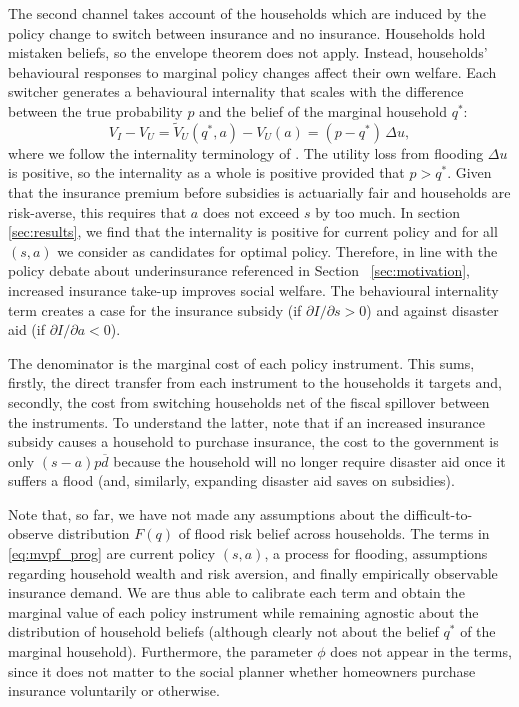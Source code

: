 \documentclass[12pt]{article}
\begin{document}
The second channel takes account of the households which are induced by the policy change to switch between insurance and no insurance. Households hold mistaken beliefs, so the envelope theorem does not apply. Instead, households' behavioural responses to marginal policy changes affect their own welfare. Each switcher generates a behavioural internality that scales with the difference between the true probability $p$ and the belief of the marginal household $q^*$:
\begin{equation}
    V_I - V_U = \tilde{V}_U(q^*,a) - V_U(a) = (p-q^*)\,\Delta u, \label{eq:internality_prog}
\end{equation}
where we follow the internality terminology of \cite{allcott2019regressive}. The utility loss from flooding $\Delta u$ is positive, so the internality as a whole is positive provided that $p>q^*$. Given that the insurance premium before subsidies is actuarially fair and households are risk-averse, this requires that $a$ does not exceed $s$ by too much. In section \ref{sec:results}, we find that the internality is positive for current policy and for all $(s,a)$ we consider as candidates for optimal policy. Therefore, in line with the policy debate about underinsurance referenced in Section ~\ref{sec:motivation}, increased insurance take-up improves social welfare. The behavioural internality term creates a case for the insurance subsidy (if $\partial I/\partial s>0$) and against disaster aid  (if $\partial I/\partial a<0$).   

The denominator is the marginal cost of each policy instrument. This sums, firstly, the direct transfer from each instrument to the households it targets and, secondly, the cost from switching households net of the fiscal spillover between the instruments. To understand the latter, note that if an increased insurance subsidy causes a household to purchase insurance, the cost to the government is only $(s-a)p\overline{d}$ because the household will no longer require disaster aid once it suffers a flood (and, similarly, expanding disaster aid saves on subsidies).    



Note that, so far, we have not made any assumptions about the difficult-to-observe distribution $F(q)$ of flood risk belief across households. The terms in \eqref{eq:mvpf_prog} are current policy $(s,a)$, a process for flooding, assumptions regarding household wealth and risk aversion, and finally empirically observable insurance demand. We are thus able to calibrate each term and obtain the marginal value of each policy instrument while remaining agnostic about the distribution of household beliefs (although clearly not about the belief $q^*$ of the marginal household). Furthermore, the parameter $\phi$ does not appear in the terms, since it does not matter to the social planner whether homeowners purchase insurance voluntarily or otherwise.
\end{document}
